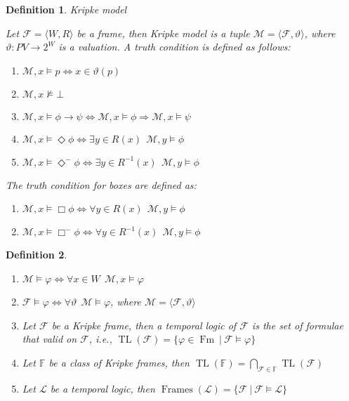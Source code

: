 \documentclass[a4paper]{article}
\theoremstyle{defin}
\newtheorem{defin}{Definition}
\theoremstyle{theorem}
\theoremstyle{prop}
\theoremstyle{lemma}
\theoremstyle{ex}
\theoremstyle{col}
\newcommand{\BoxM}{\Box^{-}}
\newcommand{\DiamondM}{\Diamond^{-}}
\begin{document}
\begin{defin} Kripke model

  Let $\mathcal{F} = \langle W, R \rangle$ be a frame, then Kripke model is a tuple $\mathcal{M} = \langle \mathcal{F}, \vartheta \rangle$, where $\vartheta : PV \to 2^W$ is a valuation. A truth condition is defined as follows:

  \begin{enumerate}
    \item $\mathcal{M}, x \models p \Leftrightarrow x \in \vartheta(p)$
    \item $\mathcal{M}, x \nvDash \bot$
    \item $\mathcal{M}, x \models \phi \to \psi \Leftrightarrow \mathcal{M}, x \models \phi \Rightarrow \mathcal{M}, x \models \psi$
    \item $\mathcal{M}, x \models \Diamond \phi \Leftrightarrow \exists y \in R(x) \:\: \mathcal{M}, y \models \phi$
    \item $\mathcal{M}, x \models \DiamondM \phi \Leftrightarrow \exists y \in R^{-1}(x) \:\: \mathcal{M}, y \models \phi$
  \end{enumerate}

  The truth condition for boxes are defined as:

  \begin{enumerate}
    \item $\mathcal{M}, x \models \Box \phi \Leftrightarrow \forall y \in R(x) \:\: \mathcal{M}, y \models \phi$
    \item $\mathcal{M}, x \models \BoxM \phi \Leftrightarrow \forall y \in R^{-1}(x) \:\: \mathcal{M}, y \models \phi$
  \end{enumerate}
\end{defin}

\begin{defin}
  $ $

  \begin{enumerate}
    \item $\mathcal{M} \models \varphi \Leftrightarrow \forall x \in W \:\: \mathcal{M}, x \models \varphi$
    \item $\mathcal{F} \models \varphi \Leftrightarrow \forall \vartheta \:\: \mathcal{M} \models \varphi$, where $\mathcal{M} = \langle \mathcal{F}, \vartheta \rangle$
    \item Let $\mathcal{F}$ be a Kripke frame, then a temporal logic of $\mathcal{F}$ is the set of formulae that valid on $\mathcal{F}$, i.e., $\operatorname{TL}(\mathcal{F}) = \{ \varphi \in \operatorname{Fm} \: | \: \mathcal{F} \models \varphi \}$
    \item Let $\mathbb{F}$ be a class of Kripke frames, then $\operatorname{TL}(\mathbb{F}) = \bigcap \limits_{\mathcal{F} \in \mathbb{F}} \operatorname{TL}(\mathcal{F})$
    \item Let $\mathcal{L}$ be a temporal logic, then $\operatorname{Frames}(\mathcal{L}) = \{ \mathcal{F} \: | \: \mathcal{F} \models \mathcal{L} \}$
  \end{enumerate}
\end{defin}
\end{document}
